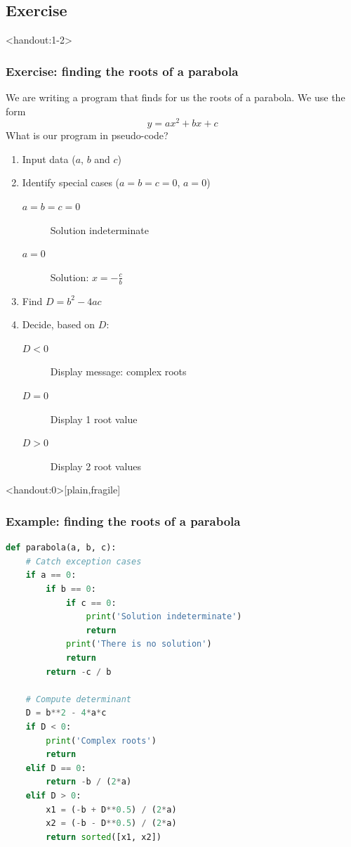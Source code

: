 
\subsection*{Exercise}
\begin{frame}<handout:1-2>
  \frametitle{Exercise: finding the roots of a parabola}
  We are writing a program that finds for us the roots of a parabola. We use the form
  \[
    y = ax^2 + bx + c
  \]
  \pause
  What is our program in pseudo-code? \pause
  \begin{enumerate}[<+->]
    \item Input data ($a$, $b$ and $c$)
    \item Identify special cases ($a=b=c=0$, $a=0$)
    \begin{description}
      \item[$a=b=c=0$] Solution indeterminate
      \item[$a=0$] Solution: $x = -\frac{c}{b}$
    \end{description}
    \item Find $D = b^2-4ac$
    \item Decide, based on $D$:
    \begin{description}
      \item[$D<0$] Display message: complex roots
      \item[$D=0$] Display 1 root value
      \item[$D>0$] Display 2 root values
    \end{description}
  \end{enumerate}
\end{frame}

\begin{frame}<handout:0>[plain,fragile]
  \frametitle{Example: finding the roots of a parabola}
  \small\selectfont
  \begin{lstlisting}[language=Python,basicstyle=\scriptsize\ttfamily]
def parabola(a, b, c):
    # Catch exception cases
    if a == 0:
        if b == 0:
            if c == 0:
                print('Solution indeterminate')
                return
            print('There is no solution')
            return
        return -c / b

    # Compute determinant
    D = b**2 - 4*a*c
    if D < 0:
        print('Complex roots')
        return
    elif D == 0:
        return -b / (2*a)
    elif D > 0:
        x1 = (-b + D**0.5) / (2*a)
        x2 = (-b - D**0.5) / (2*a)
        return sorted([x1, x2])
  \end{lstlisting}
\end{frame}

